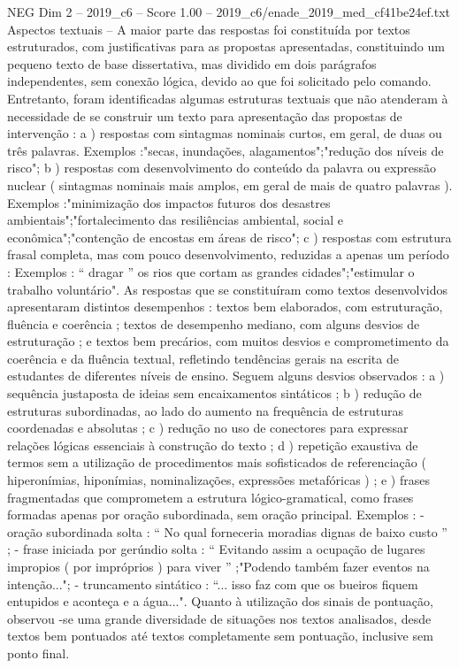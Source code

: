 \begin{textsample}{NEG Dim 2 – 2019\_c6 – Score 1.00 – 2019\_c6/enade\_2019\_med\_cf41be24ef.txt}
Aspectos textuais – A maior parte das respostas foi constituída por textos estruturados, com justificativas para as propostas apresentadas, constituindo um pequeno texto de base dissertativa, mas dividido em dois parágrafos independentes, sem conexão lógica, devido ao que foi solicitado pelo comando.
Entretanto, foram identificadas algumas estruturas textuais que não atenderam à necessidade de se construir um texto para apresentação das propostas de intervenção : a ) respostas com sintagmas nominais curtos, em geral, de duas ou três palavras.
Exemplos :"secas, inundações, alagamentos";"redução dos níveis de risco"; b ) respostas com desenvolvimento do conteúdo da palavra ou expressão nuclear ( sintagmas nominais mais amplos, em geral de mais de quatro palavras ).
Exemplos :"minimização dos impactos futuros dos desastres ambientais";"fortalecimento das resiliências ambiental, social e econômica";"contenção de encostas em áreas de risco"; c ) respostas com estrutura frasal completa, mas com pouco desenvolvimento, reduzidas a apenas um período : Exemplos : “ dragar ” os rios que cortam as grandes cidades";"estimular o trabalho voluntário".
As respostas que se constituíram como textos desenvolvidos apresentaram distintos desempenhos : textos bem elaborados, com estruturação, fluência e coerência ; textos de desempenho mediano, com alguns desvios de estruturação ; e textos bem precários, com muitos desvios e comprometimento da coerência e da fluência textual, refletindo tendências gerais na escrita de estudantes de diferentes níveis de ensino.
Seguem alguns desvios observados : a ) sequência justaposta de ideias sem encaixamentos sintáticos ; b ) redução de estruturas subordinadas, ao lado do aumento na frequência de estruturas coordenadas e absolutas ; c ) redução no uso de conectores para expressar relações lógicas essenciais à construção do texto ; d ) repetição exaustiva de termos sem a utilização de procedimentos mais sofisticados de referenciação ( hiperonímias, hiponímias, nominalizações, expressões metafóricas ) ; e ) frases fragmentadas que comprometem a estrutura lógico-gramatical, como frases formadas apenas por oração subordinada, sem oração principal.
Exemplos : - oração subordinada solta : “ No qual forneceria moradias dignas de baixo custo ” ; - frase iniciada por gerúndio solta : “ Evitando assim a ocupação de lugares impropios ( por impróprios ) para viver ” ;"Podendo também fazer eventos na intenção..."; - truncamento sintático : “... isso faz com que os bueiros fiquem entupidos e aconteça e a água...".
Quanto à utilização dos sinais de pontuação, observou -se uma grande diversidade de situações nos textos analisados, desde textos bem pontuados até textos completamente sem pontuação, inclusive sem ponto final.

\end{textsample}
